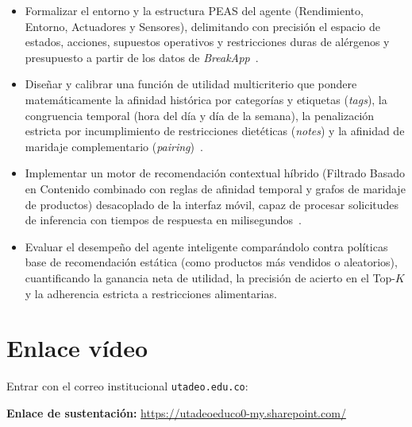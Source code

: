 \documentclass{article}
\begin{document}
\begin{itemize}
    \item Formalizar el entorno y la estructura PEAS del agente (Rendimiento, Entorno, Actuadores y Sensores), delimitando con precisión el espacio de estados, acciones, supuestos operativos y restricciones duras de alérgenos y presupuesto a partir de los datos de \textit{BreakApp}~\cite{russell2020artificial}.
    \item Diseñar y calibrar una función de utilidad multicriterio que pondere matemáticamente la afinidad histórica por categorías y etiquetas (\textit{tags}), la congruencia temporal (hora del día y día de la semana), la penalización estricta por incumplimiento de restricciones dietéticas (\textit{notes}) y la afinidad de maridaje complementario (\textit{pairing})~\cite{adomavicius2011context}.
    \item Implementar un motor de recomendación contextual híbrido (Filtrado Basado en Contenido combinado con reglas de afinidad temporal y grafos de maridaje de productos) desacoplado de la interfaz móvil, capaz de procesar solicitudes de inferencia con tiempos de respuesta en milisegundos~\cite{burke2002hybrid}.
    \item Evaluar el desempeño del agente inteligente comparándolo contra políticas base de recomendación estática (como productos más vendidos o aleatorios), cuantificando la ganancia neta de utilidad, la precisión de acierto en el Top-$K$ y la adherencia estricta a restricciones alimentarias.
\end{itemize}

\section{Enlace vídeo}

Entrar con el correo institucional \texttt{utadeo.edu.co}:

\vspace{0.3cm}
\noindent \textbf{Enlace de sustentación:} \url{https://utadeoeduco0-my.sharepoint.com/}

\printbibliography

\newpage
\thispagestyle{empty}
\vspace*{0.3\textwidth}

\begin{figure}[H]
  \centering
  
\end{figure}
\end{document}
